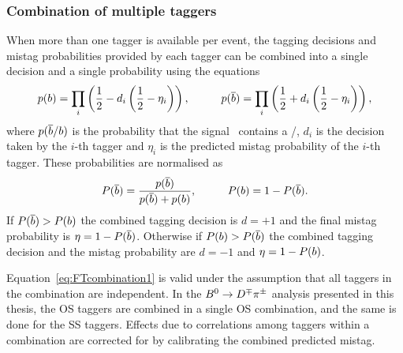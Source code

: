 \subsubsection{Combination of multiple taggers}
\label{sec:tagging:combination}

When more than one tagger is available per event, the tagging
decisions and mistag probabilities provided by each tagger can be combined into a single decision and a
single probability using the equations
\begin{equation}
	p(b) = \prod_i\left(\frac{1}{2}-d_i\left(\frac{1}{2}-\eta_i\right)\right),\hspace{1cm}
	p(\overline {b}) = \prod_i\left(\frac{1}{2}+d_i\left(\frac{1}{2}-\eta_i\right)\right), \label{eq:FTcombination1}
\end{equation}
where $p(\overline {b}/b)$ is the probability that the signal \Bz~contains a \bquarkbar/\bquark,
$d_i$ is the decision taken by the $i$-th tagger and
$\eta_i$ is the predicted mistag probability of the $i$-th tagger. These probabilities are
normalised as
\begin{equation}
	P(\overline {b}) = \frac{p(\overline {b})}{p(\overline {b})+p(b)}, \hspace{1cm} P(b) = 1 - P(\overline {b}). \label{eq:FTcombination2}
\end{equation}
If $P(\overline {b})>P(b)$ the combined tagging decision is $d=+1$ and the final mistag probability is
$\eta = 1-P(\overline {b})$. Otherwise if $P(b)>P(\overline {b})$ the combined tagging decision and the mistag
probability are $d=-1$ and $\eta=1-P(b)$. 

Equation~\ref{eq:FTcombination1} is valid under the assumption that all taggers in the combination are independent.
In the $B^0\rightarrow D^\mp\pi^\pm$ analysis presented in this thesis, the OS taggers are combined in a single OS combination, and
the same is done for the SS taggers. Effects due to correlations among taggers within a combination are corrected for by calibrating
the combined predicted mistag.


